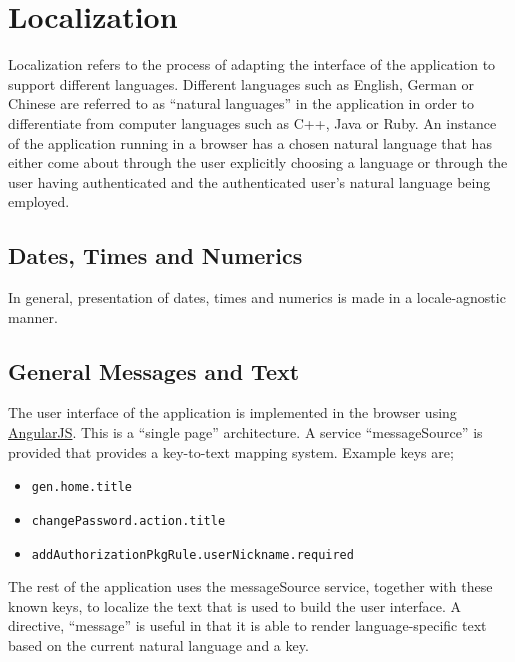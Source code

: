 
\section{Localization}
\label{localization}

Localization refers to the process of adapting the interface of the application to support different languages.  Different languages such as English, German or Chinese are referred to as ``natural languages'' in the application in order to differentiate from computer languages such as C++, Java or Ruby.  An instance of the application running in a browser has a chosen natural language that has either come about through the user explicitly choosing a language or through the user having authenticated and the authenticated user's natural language being employed.

\subsection{Dates, Times and Numerics}

In general, presentation of dates, times and numerics is made in a locale-agnostic manner.

\subsection{General Messages and Text}

The user interface of the application is implemented in the browser using \href{http://www.angularjs.org/}{AngularJS}.  This is a ``single page'' architecture.  A service ``messageSource'' is provided that provides a key-to-text mapping system.  Example keys are;

\begin{itemize}
\item {\tt gen.home.title}
\item {\tt changePassword.action.title}
\item {\tt addAuthorizationPkgRule.userNickname.required}
\end{itemize}

The rest of the application uses the messageSource service, together with these known keys, to localize the text that is used to build the user interface.  A directive, ``message'' is useful in that it is able to render language-specific text based on the current natural language and a key.

